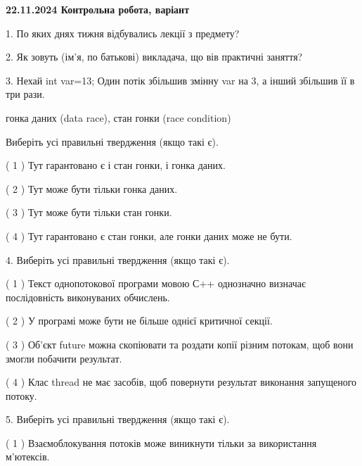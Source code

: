 \documentclass[12pt, ukrainian]{article}
\begin{document}
\vspace{4mm}
\newpage
\begin {large}

\textbf{22.11.2024 Контрольна робота, варіант  }\par


{
1. По яких днях тижня відбувались лекції з предмету?



\vspace{5mm}
2. Як зовуть (ім'я, по батькові) викладача, що вів практичні заняття?



\vspace{5mm}
3. Нехай int var=13; Один потік збільшив змінну var на 3, а інший збільшив її в три рази.

гонка даних (data race), стан гонки (race condition)

Виберіть усі правильні твердження (якщо такі є).\par
\vspace{2mm}
( 1 ) Тут гарантовано є і стан гонки, і гонка даних.%

( 2 ) Тут може бути тільки гонка даних.%

( 3 ) Тут може бути тільки стан гонки.%

( 4 ) Тут гарантовано є стан гонки, але гонки даних може не бути.%


\vspace{5mm}
4. Виберіть усі правильні твердження (якщо такі є).\par
\vspace{2mm}

( 1 ) Текст однопотокової програми мовою С++ однозначно визначає послідовність виконуваних обчислень.%

( 2 ) У програмі може бути не більше однієї критичної секції.%

( 3 ) Об’єкт future можна скопіювати та роздати копії різним потокам, щоб вони змогли побачити результат.%

( 4 ) Клас thread не має засобів, щоб повернути результат виконання запущеного потоку.%


\vspace{5mm}
5. Виберіть усі правильні твердження (якщо такі є).\par
\vspace{2mm}

( 1 ) Взаємоблокування потоків може виникнути тільки за використання м’ютексів.%

}
\end{large}
\end{document}
